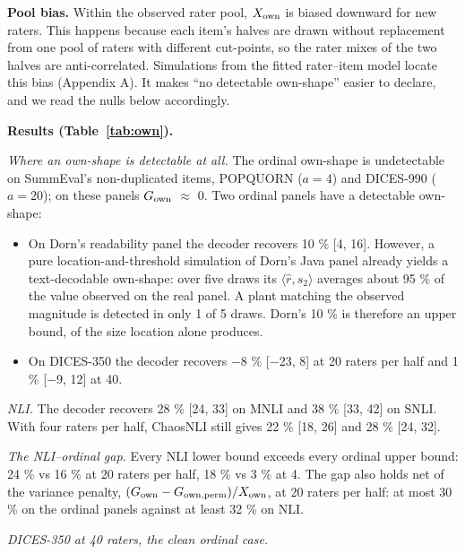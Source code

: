 \documentclass{article}
\providecommand{\tightlist}{\setlength{\itemsep}{0pt}\setlength{\parskip}{0pt}}
\begin{document}
\textbf{Pool bias.} Within the observed rater pool, \(X_{\rm own}\) is biased downward for new raters. This happens because each item's halves are drawn without replacement from one pool of raters with different cut-points, so the rater mixes of the two halves are anti-correlated. Simulations from the fitted rater--item model locate this bias (Appendix A). It makes ``no detectable own-shape'' easier to declare, and we read the nulls below accordingly.

\textbf{Results (Table~\ref{tab:own}).}

\emph{Where an own-shape is detectable at all.} The ordinal own-shape is undetectable on SummEval's non-duplicated items, POPQUORN (\(a=4\)) and DICES-990 (\(a=20\)); on these panels \(G_{\rm own}\) $\approx$ 0. Two ordinal panels have a detectable own-shape:

\begin{itemize}
\tightlist
\item
  On Dorn's readability panel the decoder recovers 10 \% {[}4, 16{]}. However, a pure location-and-threshold simulation of Dorn's Java panel already yields a text-decodable own-shape: over five draws its \(\langle\hat r, s_2\rangle\) averages about 95 \% of the value observed on the real panel. A plant matching the observed magnitude is detected in only 1 of 5 draws. Dorn's 10 \% is therefore an upper bound, of the size location alone produces.
\item
  On DICES-350 the decoder recovers $-$8 \% {[}$-$23, 8{]} at 20 raters per half and 1 \% {[}$-$9, 12{]} at 40.
\end{itemize}

\emph{NLI.} The decoder recovers 28 \% {[}24, 33{]} on MNLI and 38 \% {[}33, 42{]} on SNLI. With four raters per half, ChaosNLI still gives 22 \% {[}18, 26{]} and 28 \% {[}24, 32{]}.

\emph{The NLI--ordinal gap.} Every NLI lower bound exceeds every ordinal upper bound: 24 \% vs 16 \% at 20 raters per half, 18 \% vs 3 \% at 4. The gap also holds net of the variance penalty, \((G_{\rm own}-G_{\rm own,perm})/X_{\rm own}\), at 20 raters per half: at most 30 \% on the ordinal panels against at least 32 \% on NLI.

\emph{DICES-350 at 40 raters, the clean ordinal case.}
\end{document}
